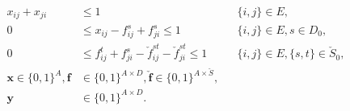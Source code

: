 \begin{subequations}
\begin{flalign}
		    \label{con:mfinpf2:zbound} x_{ij}+x_{ji}&\leq 1 &&\{i,j\}\in E, \\
  		    \label{con:mfinpf2:xbound} 0&\leq x_{ij}-f_{ij}^s+f_{ji}^s  \leq 1 && \{i,j\}\in E,  s\in D_0, \\
\label{con:mfinpf2:fbound} 0&\leq f_{ij}^t+f_{ji}^s-\check{f}_{ij}^{st}-\check{f}_{ji}^{st}  \leq 1 && \{i,j\}\in E,\{s,t\}\in \check{S}_0, \\
		    \label{con:mfinpf2:dim}	\mathbf{x} \in \{0,1\}^{A},\mathbf{f}&\in\{0,1\}^{A \times D},\mathbf{\check{f}}\in\{0,1\}^{A\times \check{S}}, \\ 
		    \label{con:mfinpf2:dimy}\mathbf{y}&\in \{0,1\}^{A\times D}.
    \end{flalign}
    \end{subequations}  

